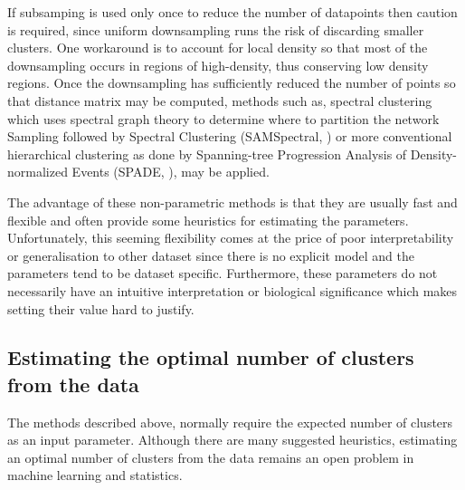 If subsamping is used only once to reduce the number of datapoints then 
caution is required, since uniform downsampling runs the risk of discarding smaller clusters.
One workaround is to account for local density so that most of the downsampling occurs in regions of high-density,
thus conserving low density regions.
Once the downsampling has sufficiently reduced the number of points so that distance matrix may be computed,
methods such as, spectral clustering which uses spectral graph theory to determine where to partition the network
Sampling followed by Spectral Clustering (SAMSpectral, \citet{Zare:2010cw}) or more conventional hierarchical clustering
as done by Spanning-tree Progression Analysis of Density-normalized Events (SPADE, \citet{Simonds:2011jh}), may be applied.

The advantage of these non-parametric methods is that they are usually fast and flexible and often provide some heuristics for estimating the parameters.  
Unfortunately, this seeming flexibility comes at the price of poor interpretability or generalisation to other dataset since there is no explicit model
and the parameters tend to be dataset specific.
Furthermore, these parameters do not necessarily have an intuitive interpretation or biological significance which makes setting their value hard to justify.


\subsection{Estimating the optimal number of clusters from the data}

The methods described above, normally require the expected number of clusters as an input parameter.
Although there are many suggested heuristics,
estimating an optimal number of clusters from the data remains an open problem in machine learning and statistics.

